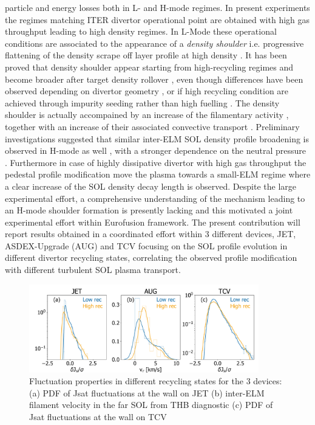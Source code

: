 \documentclass[12pt, a4paper, twoside]{article}
\begin{document}
particle and energy losses both in L- and H-mode regimes.
In present experiments the regimes matching ITER divertor operational point are obtained
with high gas throughput leading to high density regimes. In L-Mode
these operational conditions are associated to the appearance of a
\emph{density shoulder}
i.e. progressive flattening of the density
scrape off layer profile at high density
\cite{Asakura:1997is,LaBombard:2001ks,
  Carralero:2017gb}. It has been proved that density shoulder appear
starting from high-recycling regimes and become broader after target
density rollover \cite{vianello:nf2019}, even
though differences have been observed depending on divertor geometry
\cite{Wynn:2018gp}, or if high recycling condition are achieved
through impurity seeding rather than high fuelling
\cite{Wynn:2018gp,Kuang:2019248}.
The density shoulder is actually accompained by
an increase of the filamentary activity
\cite{Carralero:2017gb,vianello:nf2019,Kuang:2019248}, together with an increase of
their associated convective transport \cite{Carralero:2017gb}. Preliminary investigations suggested that similar inter-ELM SOL
density profile broadening is observed in H-mode as well
\cite{Muller:2015jt,Carralero:2017gb,vianello:nf2019}, with a stronger
dependence on the neutral pressure \cite{vianello:nf2019}.
Furthermore
in case of highly dissipative divertor with high gas throughput the
pedestal profile modification move the plasma towards a small-ELM
regime \cite{labit:nf2019} where a clear increase of
the SOL density decay length is observed.
Despite the
large experimental effort, a comprehensive understanding
of the mechanism leading to an H-mode shoulder formation is presently
lacking and this motivated a joint experimental effort within
Eurofusion framework.
The present contribution will report results obtained in a
coordinated effort within 3 different devices, JET, ASDEX-Upgrade (AUG) and
TCV focusing on the SOL profile evolution in different divertor recycling
states, correlating the observed profile modification with different turbulent SOL
plasma transport.
\begin{figure}
\includegraphics[width=100mm]{../pdfbox/SynopsisFluctuationCombined.pdf}
\caption{Fluctuation properties in different recycling states for the
  3 devices:(a) PDF of Jsat fluctuations at the wall on JET (b)
  inter-ELM filament velocity in the far SOL from THB diagnostic (c) PDF of Jsat fluctuations at the wall on TCV}
\vspace{-2.6ex}
\label{fig:figFluctuations}
\end{figure}
\end{document}
